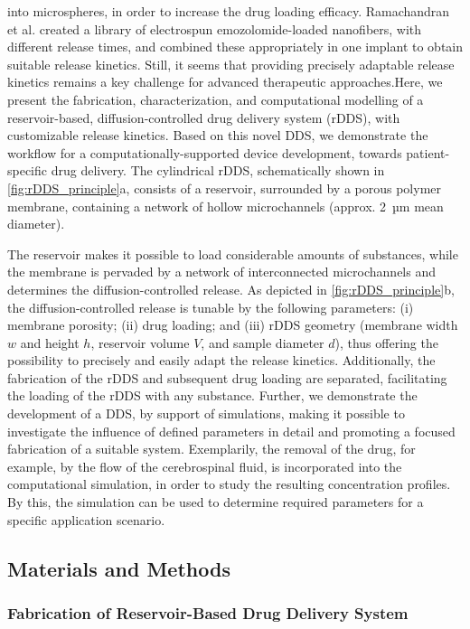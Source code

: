into microspheres, in order to increase the drug loading efficacy. Ramachandran et al.\supercite{ramachandran2017theranostic} created a library of electrospun emozolomide-loaded nanofibers, with different release times, and combined these appropriately in one implant to obtain suitable release kinetics. Still, it seems that providing precisely adaptable release kinetics remains a key challenge for advanced therapeutic approaches.Here, we present the fabrication, characterization, and computational modelling of a reservoir-based, diffusion-controlled drug delivery system (rDDS), with customizable release kinetics. Based on this novel DDS, we demonstrate the workflow for a computationally-supported device development, towards patient-specific drug delivery. The cylindrical rDDS, schematically shown in \cref{fig:rDDS_principle}a, consists of a reservoir, surrounded by a porous polymer membrane, containing a network of hollow microchannels (approx. 2~µm mean diameter). 

The reservoir makes it possible to load considerable amounts of substances, while the membrane is pervaded by a network of interconnected microchannels and determines the diffusion-controlled release. As depicted in \cref{fig:rDDS_principle}b, the diffusion-controlled release is tunable by the following parameters: (i) membrane porosity; (ii) drug loading; and (iii) rDDS geometry (membrane width $w$ and height $h$, reservoir volume $V$, and sample diameter $d$), thus offering the possibility to precisely and easily adapt the release kinetics. Additionally, the fabrication of the rDDS and subsequent drug loading are separated, facilitating the loading of the rDDS with any substance. Further, we demonstrate the development of a DDS, by support of simulations, making it possible to investigate the influence of defined parameters in detail and promoting a focused fabrication of a suitable system. Exemplarily, the removal of the drug, for example, by the flow of the cerebrospinal fluid, is incorporated into the computational simulation, in order to study the resulting concentration profiles. By this, the simulation can be used to determine required parameters for a specific application scenario.\\

\subsection{Materials and Methods}
\subsubsection{Fabrication of Reservoir-Based Drug Delivery System}

